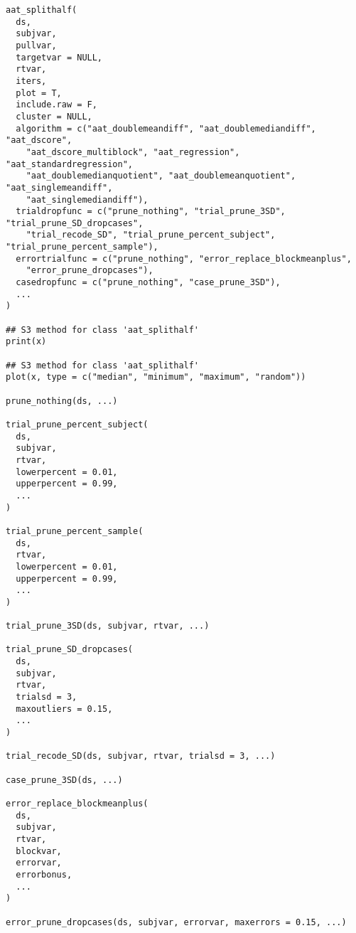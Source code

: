 \documentclass[a4paper]{book}
\begin{document}
\begin{Usage}
\begin{verbatim}
aat_splithalf(
  ds,
  subjvar,
  pullvar,
  targetvar = NULL,
  rtvar,
  iters,
  plot = T,
  include.raw = F,
  cluster = NULL,
  algorithm = c("aat_doublemeandiff", "aat_doublemediandiff", "aat_dscore",
    "aat_dscore_multiblock", "aat_regression", "aat_standardregression",
    "aat_doublemedianquotient", "aat_doublemeanquotient", "aat_singlemeandiff",
    "aat_singlemediandiff"),
  trialdropfunc = c("prune_nothing", "trial_prune_3SD", "trial_prune_SD_dropcases",
    "trial_recode_SD", "trial_prune_percent_subject", "trial_prune_percent_sample"),
  errortrialfunc = c("prune_nothing", "error_replace_blockmeanplus",
    "error_prune_dropcases"),
  casedropfunc = c("prune_nothing", "case_prune_3SD"),
  ...
)

## S3 method for class 'aat_splithalf'
print(x)

## S3 method for class 'aat_splithalf'
plot(x, type = c("median", "minimum", "maximum", "random"))

prune_nothing(ds, ...)

trial_prune_percent_subject(
  ds,
  subjvar,
  rtvar,
  lowerpercent = 0.01,
  upperpercent = 0.99,
  ...
)

trial_prune_percent_sample(
  ds,
  rtvar,
  lowerpercent = 0.01,
  upperpercent = 0.99,
  ...
)

trial_prune_3SD(ds, subjvar, rtvar, ...)

trial_prune_SD_dropcases(
  ds,
  subjvar,
  rtvar,
  trialsd = 3,
  maxoutliers = 0.15,
  ...
)

trial_recode_SD(ds, subjvar, rtvar, trialsd = 3, ...)

case_prune_3SD(ds, ...)

error_replace_blockmeanplus(
  ds,
  subjvar,
  rtvar,
  blockvar,
  errorvar,
  errorbonus,
  ...
)

error_prune_dropcases(ds, subjvar, errorvar, maxerrors = 0.15, ...)
\end{verbatim}
\end{Usage}
%
\end{document}
